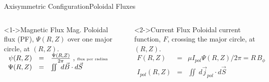 \documentclass{beamer}
\begin{document}
\begin{frame}{Axisymmetric Configuration}{Poloidal Fluxes}
\begin{columns}
	\begin{block}<1->{Magnetic Flux}
	   Mag. Poloidal flux (PF),  {  $\Psi (R,Z) $} over one major 
	   circle, at $(R, Z)$.
	    \color<1->{blue} 
	    $ \begin{array}{rcl}
	    		\psi (R,Z) &=& \frac{\Psi (R,Z)}{ 2 \pi}    \textrm{ , \tiny flux per radian } \\
			\Psi (R,Z) &=& \iint \ d \vec{B} \cdot d  \vec{S} 
	   		\end{array}$
	\end{block}
	\pause
	\begin{center}
	\includegraphics[height=2.5 cm ]{magflux.png}
	\end{center}

	
	\begin{block}<2->{Current Flux}
	  Poloidal current function, {   $F$},   crossing the major circle, at $(R,Z)$.
	     $ \begin{array}{rcl}    
	    		F (R,Z) &=& \mu I_{pol} \Psi (R,Z) / 2 \pi  = R\, B_{\phi}  \\
			I_{pol}  (R,Z) &=& \iint \ d \vec{j}_{pol} \cdot d  \vec{S} 
	   	\end{array} $
	\end{block}
  
	 {\begin{center}
	\includegraphics[height=2.5 cm]{currflux.png}
	\end{center}
	}

\end{columns}	
\end{frame}
\end{document}
